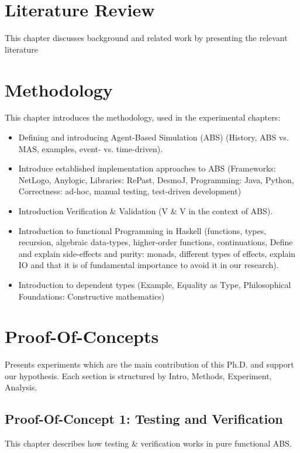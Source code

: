\section{Literature Review}
This chapter discusses background and related work by presenting the relevant literature 

\section{Methodology}
This chapter introduces the methodology, used in the experimental chapters:

\begin{itemize}
	\item Defining and introducing Agent-Based Simulation (ABS) (History, ABS vs. MAS, examples, event- vs. time-driven).
	\item Introduce established implementation approaches to ABS (Frameworks: NetLogo, Anylogic, Libraries: RePast, DesmoJ, Programming: Java, Python, Correctness: ad-hoc, manual testing, test-driven development)
	\item Introduction Verification \& Validation (V \& V in the context of ABS).
	\item Introduction to functional Programming in Haskell (functions, types, recursion, algebraic data-types, higher-order functions, continuations, Define and explain side-effects and purity: monads, different types of effects, explain IO and that it is of fundamental importance to avoid it in our research).
	\item Introduction to dependent types (Example, Equality as Type, Philosophical Foundations: Constructive mathematics)
\end{itemize}

\section{Proof-Of-Concepts}
Presents experiments which are the main contribution of this Ph.D. and support our hypothesis. Each section is structured by Intro, Methods, Experiment, Analysis.

\subsection{Proof-Of-Concept 1: Testing and Verification}
This chapter describes how testing \& verification works in pure functional ABS.

